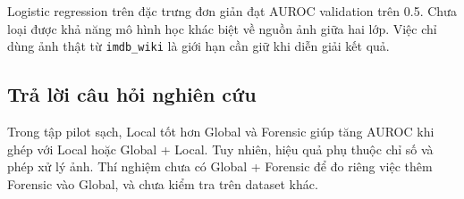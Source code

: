 Logistic regression trên đặc trưng đơn giản đạt AUROC validation trên 0.5. Chưa loại được khả năng mô hình học khác biệt về nguồn ảnh giữa hai lớp. Việc chỉ dùng ảnh thật từ \texttt{imdb\_wiki} là giới hạn cần giữ khi diễn giải kết quả.

\subsection{Trả lời câu hỏi nghiên cứu}
Trong tập pilot sạch, Local tốt hơn Global và Forensic giúp tăng AUROC khi ghép với Local hoặc Global + Local. Tuy nhiên, hiệu quả phụ thuộc chỉ số và phép xử lý ảnh. Thí nghiệm chưa có Global + Forensic để đo riêng việc thêm Forensic vào Global, và chưa kiểm tra trên dataset khác.
